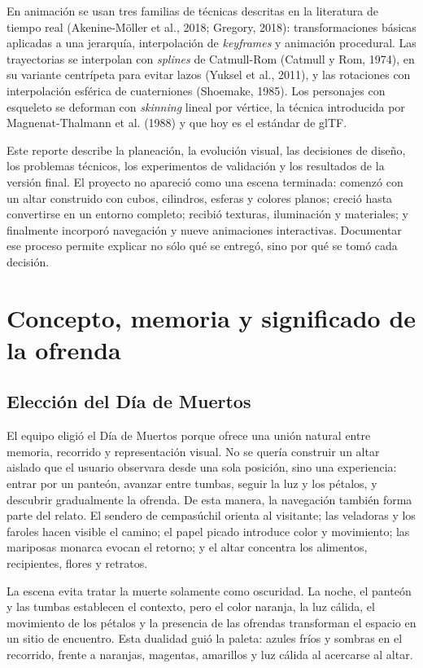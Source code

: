 \documentclass[letter,12pt]{article}
\begin{document}
	En animación se usan tres familias de técnicas descritas en la literatura de tiempo real (Akenine-Möller et al., 2018; Gregory, 2018): transformaciones básicas aplicadas a una jerarquía, interpolación de \textit{keyframes} y animación procedural. Las trayectorias se interpolan con \textit{splines} de Catmull-Rom (Catmull y Rom, 1974), en su variante centrípeta para evitar lazos (Yuksel et al., 2011), y las rotaciones con interpolación esférica de cuaterniones (Shoemake, 1985). Los personajes con esqueleto se deforman con \textit{skinning} lineal por vértice, la técnica introducida por Magnenat-Thalmann et al. (1988) y que hoy es el estándar de glTF.

	Este reporte describe la planeación, la evolución visual, las decisiones de diseño, los problemas técnicos, los experimentos de validación y los resultados de la versión final. El proyecto no apareció como una escena terminada: comenzó con un altar construido con cubos, cilindros, esferas y colores planos; creció hasta convertirse en un entorno completo; recibió texturas, iluminación y materiales; y finalmente incorporó navegación y nueve animaciones interactivas. Documentar ese proceso permite explicar no sólo qué se entregó, sino por qué se tomó cada decisión.

	\section{Concepto, memoria y significado de la ofrenda}
	\subsection{Elección del Día de Muertos}
	El equipo eligió el Día de Muertos porque ofrece una unión natural entre memoria, recorrido y representación visual. No se quería construir un altar aislado que el usuario observara desde una sola posición, sino una experiencia: entrar por un panteón, avanzar entre tumbas, seguir la luz y los pétalos, y descubrir gradualmente la ofrenda. De esta manera, la navegación también forma parte del relato. El sendero de cempasúchil orienta al visitante; las veladoras y los faroles hacen visible el camino; el papel picado introduce color y movimiento; las mariposas monarca evocan el retorno; y el altar concentra los alimentos, recipientes, flores y retratos.

	La escena evita tratar la muerte solamente como oscuridad. La noche, el panteón y las tumbas establecen el contexto, pero el color naranja, la luz cálida, el movimiento de los pétalos y la presencia de las ofrendas transforman el espacio en un sitio de encuentro. Esta dualidad guió la paleta: azules fríos y sombras en el recorrido, frente a naranjas, magentas, amarillos y luz cálida al acercarse al altar.
\end{document}
